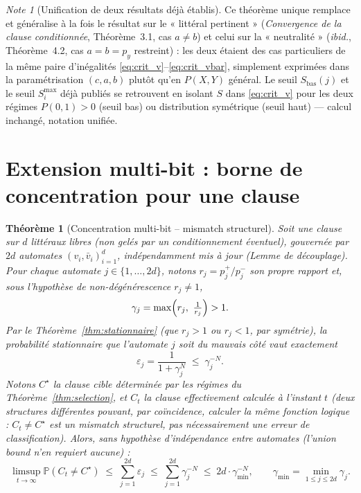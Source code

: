 \documentclass[12pt,a4paper]{article}
\newtheorem{theorem}{Théorème}[section]
\theoremstyle{remark}
\newtheorem{note}{Note}[section]
\newcommand{\vbar}{\bar{v}}
\begin{document}
\begin{note}[Unification de deux résultats déjà établis]
Ce théorème unique remplace et généralise à la fois le résultat sur le
« littéral pertinent » (\textit{Convergence de la clause conditionnée},
Théorème~3.1, cas $a\ne b$) et celui sur la « neutralité » (\emph{ibid.},
Théorème~4.2, cas $a{=}b{=}p_y$ restreint) : les deux étaient des cas
particuliers de la même paire d'inégalités \eqref{eq:crit_v}--\eqref{eq:crit_vbar},
simplement exprimées dans la paramétrisation $(c,a,b)$ plutôt qu'en $P(X,Y)$
général. Le seuil $S_{\text{bas}}(j)$ et le seuil $S_i^{\max}$ déjà publiés se
retrouvent en isolant $S$ dans \eqref{eq:crit_v} pour les deux régimes
$P(0,1)>0$ (seuil bas) ou distribution symétrique (seuil haut) --- calcul
inchangé, notation unifiée.
\end{note}

\section{Extension multi-bit : borne de concentration pour une clause}

\begin{theorem}[Concentration multi-bit -- mismatch structurel]\label{thm:multibit}
Soit une clause sur $d$ littéraux libres (non gelés par un conditionnement
éventuel), gouvernée par $2d$ automates $(v_i,\vbar_i)_{i=1}^d$, indépendamment
mis à jour (Lemme de découplage). Pour chaque automate $j\in\{1,\ldots,2d\}$,
notons $r_j=p_j^+/p_j^-$ \emph{son propre} rapport et, sous l'hypothèse de
non-dégénérescence $r_j\ne1$,
\[
  \gamma_j = \max\Bigl(r_j,\ \tfrac1{r_j}\Bigr) > 1.
\]
Par le Théorème~\ref{thm:stationnaire} (que $r_j>1$ ou $r_j<1$, par symétrie),
la probabilité stationnaire que l'automate $j$ soit du mauvais côté vaut
exactement
\[
  \varepsilon_j = \frac{1}{1+\gamma_j^N} \;\le\; \gamma_j^{-N}.
\]
Notons $C^\star$ la clause cible déterminée par les régimes du
Théorème~\ref{thm:selection}, et $C_t$ la clause effectivement calculée à
l'instant $t$ (deux structures différentes pouvant, par coïncidence, calculer
la même fonction logique : $C_t\ne C^\star$ est un \emph{mismatch structurel},
pas nécessairement une erreur de classification). Alors, sans hypothèse
d'indépendance entre automates (l'union bound n'en requiert aucune) :
\[
  \boxed{\limsup_{t\to\infty}\mathbb P(C_t\ne C^\star)
  \;\le\; \sum_{j=1}^{2d} \varepsilon_j
  \;\le\; \sum_{j=1}^{2d} \gamma_j^{-N}
  \;\le\; 2d\cdot\gamma_{\min}^{-N}}, \qquad \gamma_{\min}=\min_{1\le j\le 2d}\gamma_j.
\]
\end{theorem}
\end{document}
